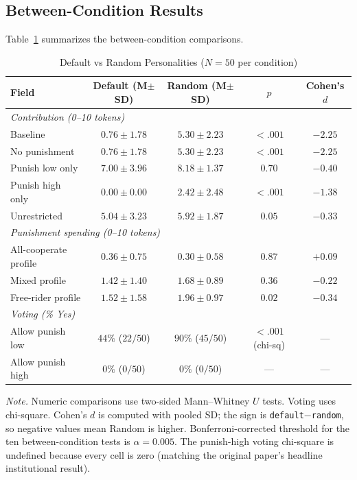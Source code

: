 \documentclass[12pt, a4paper]{article}
\begin{document}
\subsection{Between-Condition Results}

Table~\ref{tab:results} summarizes the between-condition comparisons.

\begin{table}[H]
\centering
\caption{Default vs Random Personalities ($N=50$ per condition)}
\label{tab:results}
\small
\begin{tabular}{lcccc}
\toprule
Field & Default (M$\pm$SD) & Random (M$\pm$SD) & $p$ & Cohen's $d$ \\
\midrule
\multicolumn{5}{l}{\textit{Contribution (0--10 tokens)}} \\
\quad Baseline & $0.76 \pm 1.78$ & $5.30 \pm 2.23$ & $<.001$ & $-2.25$ \\
\quad No punishment & $0.76 \pm 1.78$ & $5.30 \pm 2.23$ & $<.001$ & $-2.25$ \\
\quad Punish low only & $7.00 \pm 3.96$ & $8.18 \pm 1.37$ & $0.70$ & $-0.40$ \\
\quad Punish high only & $0.00 \pm 0.00$ & $2.42 \pm 2.48$ & $<.001$ & $-1.38$ \\
\quad Unrestricted & $5.04 \pm 3.23$ & $5.92 \pm 1.87$ & $0.05$ & $-0.33$ \\
\midrule
\multicolumn{5}{l}{\textit{Punishment spending (0--10 tokens)}} \\
\quad All-cooperate profile & $0.36 \pm 0.75$ & $0.30 \pm 0.58$ & $0.87$ & $+0.09$ \\
\quad Mixed profile & $1.42 \pm 1.40$ & $1.68 \pm 0.89$ & $0.36$ & $-0.22$ \\
\quad Free-rider profile & $1.52 \pm 1.58$ & $1.96 \pm 0.97$ & $0.02$ & $-0.34$ \\
\midrule
\multicolumn{5}{l}{\textit{Voting (\% Yes)}} \\
\quad Allow punish low & $44\%$ ($22/50$) & $90\%$ ($45/50$) & $<.001$ (chi-sq) & --- \\
\quad Allow punish high & $0\%$ ($0/50$) & $0\%$ ($0/50$) & --- & --- \\
\bottomrule
\end{tabular}

\medskip
\footnotesize
\textit{Note.} Numeric comparisons use two-sided Mann--Whitney $U$ tests. Voting uses chi-square. Cohen's $d$ is computed with pooled SD; the sign is \texttt{default$-$random}, so negative values mean Random is higher. Bonferroni-corrected threshold for the ten between-condition tests is $\alpha=0.005$. The punish-high voting chi-square is undefined because every cell is zero (matching the original paper's headline institutional result).
\end{table}
\end{document}

